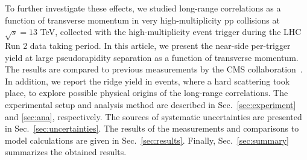 % 

To further investigate these effects, we studied long-range correlations as a function of transverse momentum in very high-multiplicity pp collisions at $\sqrt{s} =13$ TeV, collected with the high-multiplicity event trigger during the LHC Run 2 data taking period. In this article, we present the near-side per-trigger yield at large pseudorapidity separation as a function of transverse momentum. The results are compared to previous measurements by the CMS collaboration~\cite{Khachatryan:2015lva}. In addition, we report the ridge yield in events, where a hard scattering took place, to explore possible physical origins of the long-range correlations.
The experimental setup and analysis method are described in Sec.~\ref{sec:experiment} and \ref{sec:ana}, respectively. The sources of systematic uncertainties are presented in Sec.~\ref{sec:uncertainties}. The results of the measurements and comparisons to model calculations are given in Sec.~\ref{sec:results}. Finally, Sec.~\ref{sec:summary} summarizes the obtained results.

